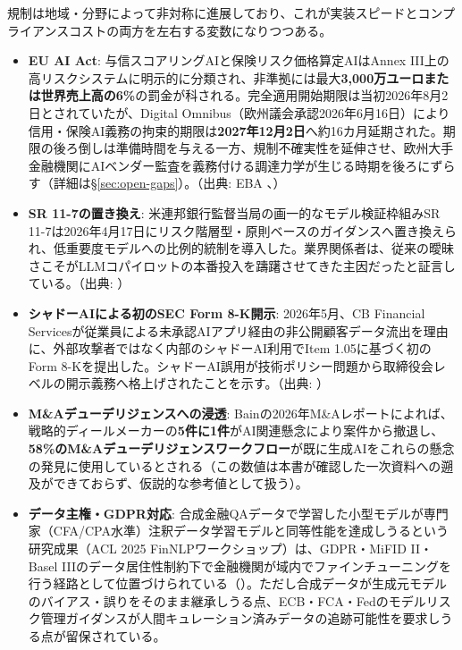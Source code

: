 規制は地域・分野によって非対称に進展しており、これが実装スピードとコンプライアンスコストの両方を左右する変数になりつつある。

\begin{itemize}
  \item \textbf{EU AI Act}: 与信スコアリングAIと保険リスク価格算定AIはAnnex III上の高リスクシステムに明示的に分類され、非準拠には最大\textbf{3,000万ユーロまたは世界売上高の6\%}の罰金が科される。完全適用開始期限は当初2026年8月2日とされていたが、Digital Omnibus（欧州議会承認2026年6月16日）により信用・保険AI義務の拘束的期限は\textbf{2027年12月2日}へ約16カ月延期された\cite{x07digitalomnibus2026}。期限の後ろ倒しは準備時間を与える一方、規制不確実性を延伸させ、欧州大手金融機関にAIベンダー監査を義務付ける調達力学が生じる時期を後ろにずらす（詳細は\S\ref{sec:open-gaps}）。（出典: EBA \cite{eba2025aiact}、\cite{x07digitalomnibus2026}）
  \item \textbf{SR 11-7の置き換え}: 米連邦銀行監督当局の画一的なモデル検証枠組みSR 11-7は2026年4月17日にリスク階層型・原則ベースのガイダンスへ置き換えられ、低重要度モデルへの比例的統制を導入した。業界関係者は、従来の曖昧さこそがLLMコパイロットの本番投入を躊躇させてきた主因だったと証言している。（出典: \cite{databricksndmodelrisk}）
  \item \textbf{シャドーAIによる初のSEC Form 8-K開示}: 2026年5月、CB Financial Servicesが従業員による未承認AIアプリ経由の非公開顧客データ流出を理由に、外部攻撃者ではなく内部のシャドーAI利用でItem 1.05に基づく初のForm 8-Kを提出した。シャドーAI誤用が技術ポリシー問題から取締役会レベルの開示義務へ格上げされたことを示す。（出典: \cite{wsgrndshadowai}）
  \item \textbf{M\&Aデューデリジェンスへの浸透}: Bainの2026年M\&Aレポートによれば、戦略的ディールメーカーの\textbf{5件に1件}がAI関連懸念により案件から撤退し、\textbf{58\%のM\&Aデューデリジェンスワークフロー}が既に生成AIをこれらの懸念の発見に使用しているとされる（この数値は本書が確認した一次資料への遡及ができておらず、仮説的な参考値として扱う）。
  \item \textbf{データ主権・GDPR対応}: 合成金融QAデータで学習した小型モデルが専門家（CFA/CPA水準）注釈データ学習モデルと同等性能を達成しうるという研究成果（ACL 2025 FinNLPワークショップ）は、GDPR・MiFID II・Basel IIIのデータ居住性制約下で金融機関が域内でファインチューニングを行う経路として位置づけられている（\cite{aclfinnlp2025synthetic}）。ただし合成データが生成元モデルのバイアス・誤りをそのまま継承しうる点、ECB・FCA・Fedのモデルリスク管理ガイダンスが人間キュレーション済みデータの追跡可能性を要求しうる点が留保されている。
\end{itemize}

